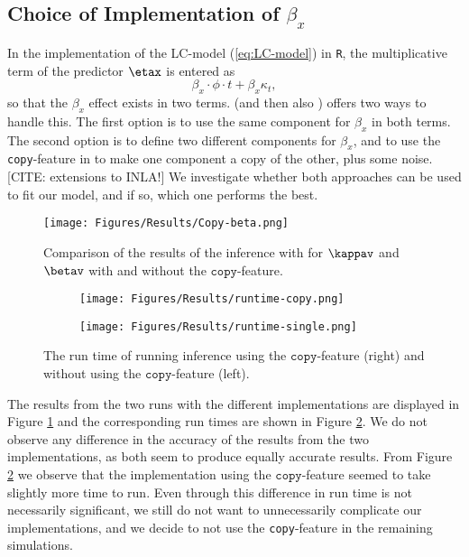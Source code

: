 \subsection{Choice of Implementation of $\beta_x$}
In the implementation of the LC-model (\ref{eq:LC-model}) in \texttt{R}, the multiplicative term of the predictor $\etax$ is entered as
\begin{equation}
    \beta_x\cdot\phi \cdot t + \beta_x\kappa_t,
\end{equation}
so that the $\beta_x$ effect exists in two terms. \inla (and then also \inlabru) offers two ways to handle this. The first option is to use the same component for $\beta_x$ in both terms. The second option is to define two different components for $\beta_x$, and to use the \texttt{copy}-feature in \inla to make one component a copy of the other, plus some noise. [CITE: extensions to INLA!] We investigate whether both approaches can be used to fit our model, and if so, which one performs the best. 
\begin{figure}[h!]
    \centering
    \texttt{[image: Figures/Results/Copy-beta.png]}
    \caption{Comparison of the results of the inference with \inlabru for $\kappav$ and $\betav$ with and without the $\texttt{copy}$-feature.}
    \label{fig:copyBetaComparison}
\end{figure}

\begin{figure}[h!]
    \centering
    \begin{subfigure}[b]{0.45\textwidth}
        \centering
        \texttt{[image: Figures/Results/runtime-copy.png]}
    \end{subfigure}
    \begin{subfigure}[b]{0.45\textwidth}
        \centering
        \texttt{[image: Figures/Results/runtime-single.png]}
    \end{subfigure}
    \caption{The run time of running \inlabru inference using the $\texttt{copy}$-feature (right) and without using the $\texttt{copy}$-feature (left).}
    \label{fig:copyBetaRuntimes}
\end{figure}

The results from the two runs with the different implementations are displayed in Figure \ref{fig:copyBetaComparison} and the corresponding run times are shown in Figure \ref{fig:copyBetaRuntimes}. We do not observe any difference in the accuracy of the results from the two implementations, as both seem to produce equally accurate results. From Figure \ref{fig:copyBetaRuntimes} we observe that the implementation using the $\texttt{copy}$-feature seemed to take slightly more time to run. Even through this difference in run time is not necessarily significant, we still do not want to unnecessarily complicate our implementations, and we decide to not use the \texttt{copy}-feature in the remaining simulations.

